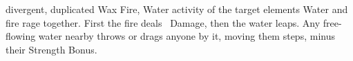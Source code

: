   {divergent, duplicated}%
  {Wax}%
  {Fire, Water}%
  {activity of the target elements}%
  {%
    Water and fire rage together.
    First the fire deals \showDam~Damage, then the water leaps.
    Any free-flowing water nearby throws or drags anyone by it, moving them  \glspl{step}, minus their Strength Bonus.
  }%
  {}
